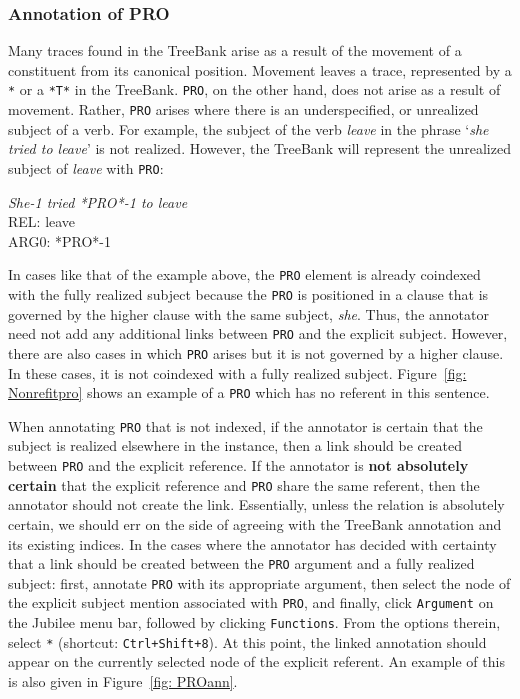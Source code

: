 \documentclass[11pt]{report}
\begin{document}
\subsubsection{Annotation of PRO}
\label{sec: PRO}

Many traces found in the TreeBank arise as a result of the movement of a constituent from its canonical position.  Movement leaves a trace, represented by a \texttt{*} or a \texttt{*T*} in the TreeBank.  \texttt{PRO}, on the other hand, does not arise as a result of movement.  Rather, \texttt{PRO} arises where there is an underspecified, or unrealized subject of a verb.  For example, the subject of the verb \textit{leave} in the phrase `\textit{she tried to leave}' is not realized.  However, the TreeBank will represent the unrealized subject of \textit{leave} with \texttt{PRO}: 

\textit{She-1 tried *PRO*-1 to leave}\\
REL: leave\\
ARG0: *PRO*-1

In cases like that of the example above, the \texttt{PRO} element is already coindexed with the fully realized subject because the \texttt{PRO} is positioned in a clause that is governed by the higher clause with the same subject, \textit{she}.  Thus, the annotator need not add any additional links between \texttt{PRO} and the explicit subject.  However, there are also cases in which \texttt{PRO} arises but it is not governed by a higher clause.  In these cases, it is not coindexed with a fully realized subject.  Figure~\ref{fig: Nonrefitpro} shows an example of a \texttt{PRO} which has no referent in this sentence. 

When annotating \texttt{PRO} that is not indexed, if the annotator is certain that the subject is realized elsewhere in the instance, then a link should be created between \texttt{PRO} and the explicit reference. If the annotator is \textbf{not absolutely certain} that the explicit reference and \texttt{PRO} share the same referent, then the annotator should not create the link.  Essentially, unless the relation is absolutely certain, we should err on the side of agreeing with the TreeBank annotation and its existing indices. In the cases where the annotator has decided with certainty that a link should be created between the \texttt{PRO} argument and a fully realized subject: first, annotate \texttt{PRO} with its appropriate argument, then select the node of the explicit subject mention associated with \texttt{PRO}, and finally, click {\tt Argument} on the Jubilee menu bar, followed by clicking {\tt Functions}.  From the options therein, select \texttt{*} (shortcut: \texttt{Ctrl+Shift+8}).  At this point, the linked annotation should appear on the currently selected node of the explicit referent.  An example of this is also given in Figure~\ref{fig: PROann}.
\end{document}
